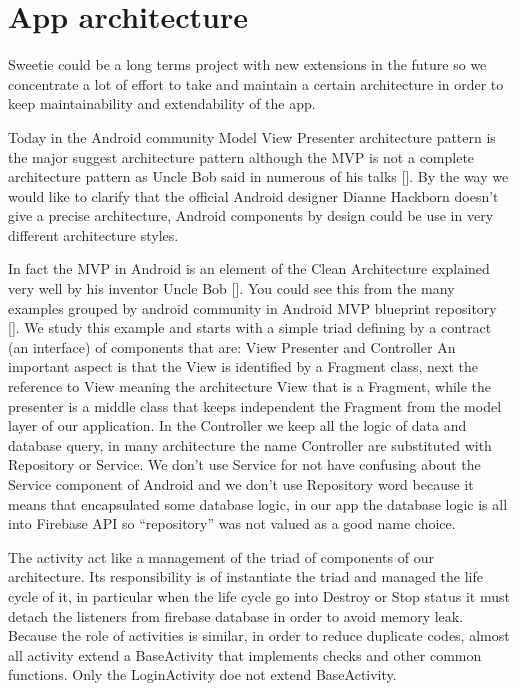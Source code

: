 
\section{App architecture}
\label{sec:app-architecture}

Sweetie could be a long terms project with new extensions in the future so we concentrate a lot of effort to take and maintain a certain architecture in order to keep maintainability and extendability of the app.

Today in the Android community Model View Presenter architecture pattern is the major suggest architecture pattern although the MVP is not a complete architecture pattern as Uncle Bob said in numerous of his talks [].  By the way we would like to clarify that the official Android designer Dianne Hackborn \cite{Dianne_Hackborn_android_arch} doesn't give a precise architecture, Android components by design could be use in very different architecture styles.

In fact the MVP in Android is an element of the Clean Architecture explained very well by his inventor Uncle Bob []. You could see this from the many examples grouped by android community in Android MVP blueprint repository []. We study this example and starts with a simple triad defining by a contract (an interface) of components that are:
View Presenter and Controller
An important aspect is that the View is identified by a Fragment class, next the reference to View meaning the architecture View that is a Fragment, while the presenter is a middle class that keeps independent the Fragment from the model layer of our application. In the Controller we keep all the logic of data and database query, in many architecture the name Controller are substituted with Repository or Service. We don't use Service for not have confusing about the Service component of Android and we don't use Repository word because it means that encapsulated some database logic, in our app the database logic is all into Firebase API so ``repository'' was not valued as a good name choice. 

The activity act like a management of the triad of components of our architecture.
Its responsibility is of instantiate the triad and managed the life cycle of it, in particular when the life cycle go into Destroy or Stop status it must detach the listeners from firebase database in order to avoid memory leak. Because the role of activities is similar, in order to reduce duplicate codes, almost all activity extend a BaseActivity that implements checks and other common functions. Only the LoginActivity doe not extend BaseActivity.

